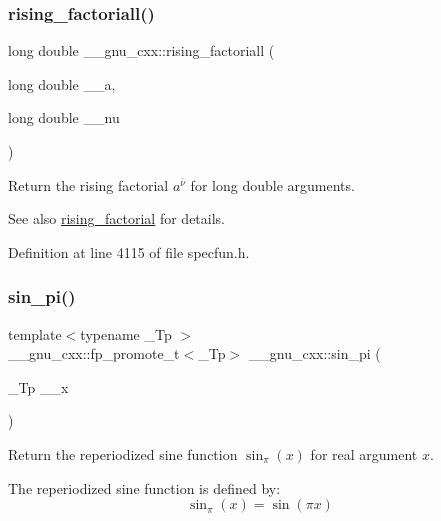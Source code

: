 \subsubsection{\texorpdfstring{rising\+\_\+factoriall()}{rising\_factoriall()}}
{\footnotesize\ttfamily long double \+\_\+\+\_\+gnu\+\_\+cxx\+::rising\+\_\+factoriall (\begin{DoxyParamCaption}\item[{long double}]{\+\_\+\+\_\+a,  }\item[{long double}]{\+\_\+\+\_\+nu }\end{DoxyParamCaption})\hspace{0.3cm}{\ttfamily [inline]}}

Return the rising factorial $ a^{\overline{\nu}} $ for {\ttfamily  long double } arguments.

\begin{DoxySeeAlso}{See also}
\hyperlink{group__gnu__math__spec__func_gae8c36a0e1f60254cf212a3806f7c675c}{rising\+\_\+factorial} for details. 
\end{DoxySeeAlso}


Definition at line 4115 of file specfun.\+h.

\mbox{\label{group__gnu__math__spec__func_ga220f8a9a0477697cff96e84dc911d5f0}} 
\subsubsection{\texorpdfstring{sin\+\_\+pi()}{sin\_pi()}}
{\footnotesize\ttfamily template$<$typename \+\_\+\+Tp $>$ \\
\+\_\+\+\_\+gnu\+\_\+cxx\+::fp\+\_\+promote\+\_\+t$<$\+\_\+\+Tp$>$ \+\_\+\+\_\+gnu\+\_\+cxx\+::sin\+\_\+pi (\begin{DoxyParamCaption}\item[{\+\_\+\+Tp}]{\+\_\+\+\_\+x }\end{DoxyParamCaption})\hspace{0.3cm}{\ttfamily [inline]}}

Return the reperiodized sine function $ \sin_\pi(x) $ for real argument $ x $.

The reperiodized sine function is defined by\+: \[ \sin_\pi(x) = \sin(\pi x) \]


